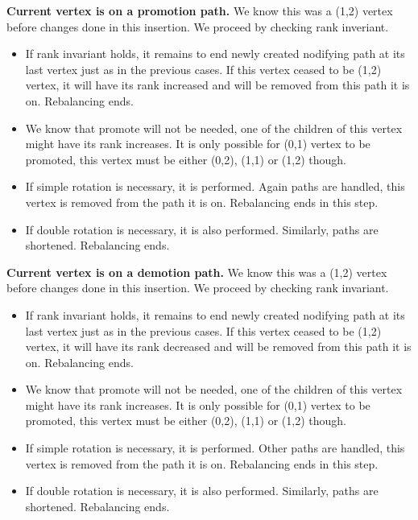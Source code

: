 \textbf{Current vertex is on a promotion path.} We know this was a (1,2) vertex before changes done in this insertion. We proceed by checking rank inveriant. 

\begin{itemize}

\item If rank invariant holds, it remains to end newly created nodifying path at its last vertex just as in the previous cases. If this vertex ceased to be (1,2) vertex, it will have its rank increased and will be removed from this path it is on. Rebalancing ends.

\item We know that promote will not be needed, one of the children of this vertex might have its rank increases. It is only possible for (0,1) vertex to be promoted, this vertex must be either (0,2), (1,1) or (1,2) though.

\item If simple rotation is necessary, it is performed. Again paths are handled, this vertex is removed from the path it is on. Rebalancing ends in this step.

\item If double rotation is necessary, it is also performed. Similarly, paths are shortened. Rebalancing ends.

\end{itemize}

\textbf{Current vertex is on a demotion path.} We know this was a (1,2) vertex before changes done in this insertion. We proceed by checking rank invariant. 

\begin{itemize}

\item If rank invariant holds, it remains to end newly created nodifying path at its last vertex just as in the previous cases. If this vertex ceased to be (1,2) vertex, it will have its rank decreased and will be removed from this path it is on. Rebalancing ends.

\item We know that promote will not be needed, one of the children of this vertex might have its rank increases. It is only possible for (0,1) vertex to be promoted, this vertex must be either (0,2), (1,1) or (1,2) though.

\item If simple rotation is necessary, it is performed. Other paths are handled, this vertex is removed from the path it is on. Rebalancing ends in this step.

\item If double rotation is necessary, it is also performed. Similarly, paths are shortened. Rebalancing ends.

\end{itemize}

